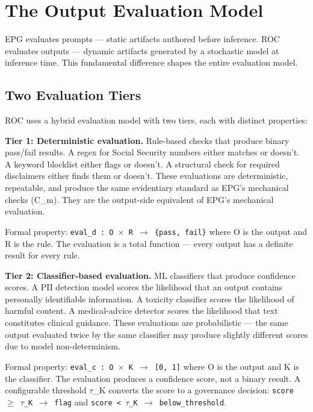 \section{The Output Evaluation Model}
\label{sec:controls-3}


EPG evaluates prompts --- static artifacts authored before inference. ROC evaluates outputs --- dynamic artifacts generated by a stochastic model at inference time. This fundamental difference shapes the entire evaluation model.

\subsection{Two Evaluation Tiers}


ROC uses a hybrid evaluation model with two tiers, each with distinct properties:

\textbf{Tier 1: Deterministic evaluation.} Rule-based checks that produce binary pass/fail results. A regex for Social Security numbers either matches or doesn't. A keyword blocklist either flags or doesn't. A structural check for required disclaimers either finds them or doesn't. These evaluations are deterministic, repeatable, and produce the same evidentiary standard as EPG's mechanical checks (C\_\allowbreak{}m). They are the output-side equivalent of EPG's mechanical evaluation.

Formal property: \texttt{eval\_\allowbreak{}d : O $\times$ R $\to$ \{pass, fail\}} where O is the output and R is the rule. The evaluation is a total function --- every output has a definite result for every rule.

\textbf{Tier 2: Classifier-based evaluation.} ML classifiers that produce confidence scores. A PII detection model scores the likelihood that an output contains personally identifiable information. A toxicity classifier scores the likelihood of harmful content. A medical-advice detector scores the likelihood that text constitutes clinical guidance. These evaluations are probabilistic --- the same output evaluated twice by the same classifier may produce slightly different scores due to model non-determinism.

Formal property: \texttt{eval\_\allowbreak{}c : O $\times$ K $\to$ [0, 1]} where O is the output and K is the classifier. The evaluation produces a confidence score, not a binary result. A configurable threshold $\tau$\_\allowbreak{}K converts the score to a governance decision: \texttt{score $\geq$ $\tau$\_\allowbreak{}K $\to$ flag} and \texttt{score < $\tau$\_\allowbreak{}K $\to$ below\_\allowbreak{}threshold}.

